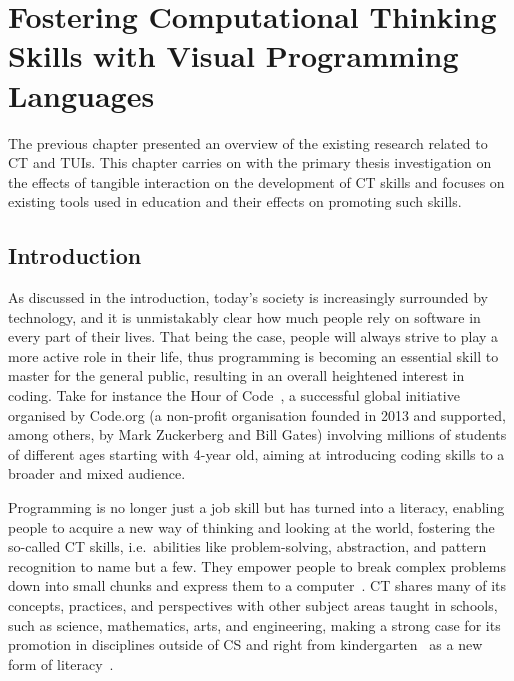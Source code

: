 %
\setcounter{chapter}{2}
\chapter{Fostering Com\-pu\-ta\-tion\-al Think\-ing Skills with Vi\-su\-al Pro\-gram\-ming Lan\-guages}\label{chap:exploration}


The previous chapter presented an overview of the existing research related to \ac{CT} and \acp{TUI}. This chapter carries on with the primary thesis investigation on the effects of tangible interaction on the development of \ac{CT} skills and focuses on existing tools used in education and their effects on promoting such skills.

\section{Introduction}
As discussed in the introduction, today's society is increasingly surrounded by technology, and it is unmistakably clear how much people rely on software in every part of their lives. That being the case, people will always strive to play a more active role in their life, thus programming is becoming an essential skill to master for the general public, resulting in an overall heightened interest in coding. Take for instance the Hour of Code~\cite{HOC}, a successful global initiative organised by Code.org (a non-profit organisation founded in 2013 and supported, among others, by Mark Zuckerberg and Bill Gates) involving millions of students of different ages starting with 4-year old, aiming at introducing coding skills to a broader and mixed audience.

Programming is no longer just a job skill but has turned into a literacy, enabling people to acquire a new way of thinking and looking at the world, fostering the so-called \ac{CT} skills, i.e.\ abilities like problem-solving, abstraction, and pattern recognition to name but a few. They empower people to break complex problems down into small chunks and express them to a computer~\cite{Vee:2013wc}. \ac{CT} shares many of its concepts, practices, and perspectives with other subject areas taught in schools, such as science, mathematics, arts, and engineering, making a strong case for its promotion in disciplines outside of \ac{CS} and right from kindergarten~\cite{Namukasa:2015wj} as a new form of literacy~\cite{Vee:2013wc}.

